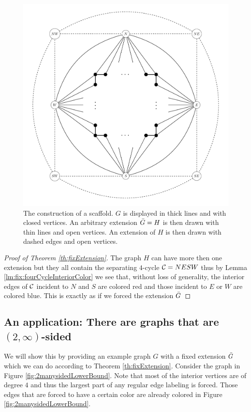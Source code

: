   \begin{figure}[h!]
  \centering
  \includegraphics[scale=0.5]{fixExtension/img/scafold}

  \caption{The construction of a scaffold. $G$ is displayed in thick lines and with closed vertices. An arbitrary extension $\bar{G} =H$ is then drawn with thin lines and open vertices. An extension of $H$ is then drawn with dashed edges and open vertices.
      \label{fig:scafold}}
  \end{figure}

  \begin{proof}[Proof of Theorem \ref{th:fixExtension}]
    The graph $H$ can have more then one extension but they all contain the separating $4$-cycle $\mathcal{C}= NESW$ thus by Lemma \ref{lm:fix:fourCycleInteriorColor} we see that, without loss of generality, the interior edges of $\mathcal{C}$ incident to $N$ and $S$ are colored red and those incident to $E$ or $W$ are colored blue. This is exactly as if we forced the extension $\bar{G}$
    \end{proof}

\subsection{An application: There are graphs that are $(2, \infty)$-sided}

  We will show this by providing an example graph $G$ with a fixed extension $\bar{G}$ which we can do according to Theorem \ref{th:fixExtension}. Consider the graph in Figure \ref{fig:2manysidedLowerBound}. Note that most of the interior vertices are of degree $4$ and thus the largest part of any regular edge labeling is forced. Those edges that are forced to have a certain color are already colored in Figure \ref{fig:2manysidedLowerBound}.


